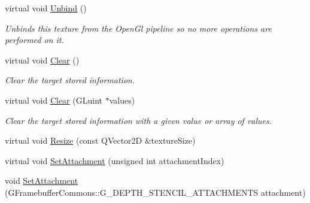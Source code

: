 \begin{DoxyCompactItemize}
\mbox{\label{class_geometry_engine_1_1_geometry_buffer_1_1_g_depth_stencil_render_buffer_a771e5a846f2f9e8f76155ad0f46cdda0}} 
virtual void \mbox{\hyperlink{class_geometry_engine_1_1_geometry_buffer_1_1_g_depth_stencil_render_buffer_a771e5a846f2f9e8f76155ad0f46cdda0}{Unbind}} ()
\begin{DoxyCompactList}\small\item\em Unbinds this texture from the Open\+Gl pipeline so no more operations are performed on it. \end{DoxyCompactList}\item 
\mbox{\label{class_geometry_engine_1_1_geometry_buffer_1_1_g_depth_stencil_render_buffer_adaf506aecb33f835e3c69bdb976fe6cf}} 
virtual void \mbox{\hyperlink{class_geometry_engine_1_1_geometry_buffer_1_1_g_depth_stencil_render_buffer_adaf506aecb33f835e3c69bdb976fe6cf}{Clear}} ()
\begin{DoxyCompactList}\small\item\em Clear the target stored information. \end{DoxyCompactList}\item 
\mbox{\label{class_geometry_engine_1_1_geometry_buffer_1_1_g_depth_stencil_render_buffer_ae1f68d905425a7422113429f5e41db46}} 
virtual void \mbox{\hyperlink{class_geometry_engine_1_1_geometry_buffer_1_1_g_depth_stencil_render_buffer_ae1f68d905425a7422113429f5e41db46}{Clear}} (G\+Luint $\ast$values)
\begin{DoxyCompactList}\small\item\em Clear the target stored information with a given value or array of values. \end{DoxyCompactList}\item 
virtual void \mbox{\hyperlink{class_geometry_engine_1_1_geometry_buffer_1_1_g_depth_stencil_render_buffer_aee7b6a5ecc14a2aac4c6f363fa609720}{Resize}} (const Q\+Vector2D \&texture\+Size)
\item 
virtual void \mbox{\hyperlink{class_geometry_engine_1_1_geometry_buffer_1_1_g_depth_stencil_render_buffer_af2877932c33e892f310de1c07ad69a20}{Set\+Attachment}} (unsigned int attachment\+Index)
\item 
void \mbox{\hyperlink{class_geometry_engine_1_1_geometry_buffer_1_1_g_depth_stencil_render_buffer_aa207dc312758fcd7657836e6783c14e4}{Set\+Attachment}} (G\+Framebuffer\+Commons\+::\+G\+\_\+\+D\+E\+P\+T\+H\+\_\+\+S\+T\+E\+N\+C\+I\+L\+\_\+\+A\+T\+T\+A\+C\+H\+M\+E\+N\+TS attachment)

\end{DoxyCompactItemize}
